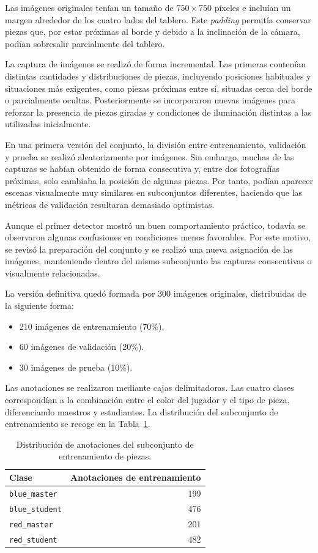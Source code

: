 Las imágenes originales tenían un tamaño de $750\times750$ píxeles e incluían un margen alrededor de los cuatro lados del tablero. Este \textit{padding} permitía conservar piezas que, por estar próximas al borde y debido a la inclinación de la cámara, podían sobresalir parcialmente del tablero.

La captura de imágenes se realizó de forma incremental. Las primeras contenían distintas cantidades y distribuciones de piezas, incluyendo posiciones habituales y situaciones más exigentes, como piezas próximas entre sí, situadas cerca del borde o parcialmente ocultas. Posteriormente se incorporaron nuevas imágenes para reforzar la presencia de piezas giradas y condiciones de iluminación distintas a las utilizadas inicialmente.

En una primera versión del conjunto, la división entre entrenamiento, validación y prueba se realizó aleatoriamente por imágenes. Sin embargo, muchas de las capturas se habían obtenido de forma consecutiva y, entre dos fotografías próximas, solo cambiaba la posición de algunas piezas. Por tanto, podían aparecer escenas visualmente muy similares en subconjuntos diferentes, haciendo que las métricas de validación resultaran demasiado optimistas.

Aunque el primer detector mostró un buen comportamiento práctico, todavía se observaron algunas confusiones en condiciones menos favorables. Por este motivo, se revisó la preparación del conjunto y se realizó una nueva asignación de las imágenes, manteniendo dentro del mismo subconjunto las capturas consecutivas o visualmente relacionadas.

La versión definitiva quedó formada por 300 imágenes originales, distribuidas de la siguiente forma:

\begin{itemize}
    \item 210 imágenes de entrenamiento (70\%).
    \item 60 imágenes de validación (20\%).
    \item 30 imágenes de prueba (10\%).
\end{itemize}

Las anotaciones se realizaron mediante cajas delimitadoras. Las cuatro clases correspondían a la combinación entre el color del jugador y el tipo de pieza, diferenciando maestros y estudiantes. La distribución del subconjunto de entrenamiento se recoge en la Tabla~\ref{tab:distribucion-piezas}.

\begin{table}[H]
\centering
\small
\begin{tabular}{l r}
\hline
\textbf{Clase} & \textbf{Anotaciones de entrenamiento} \\
\hline
\texttt{blue\_master} & 199 \\
\texttt{blue\_student} & 476 \\
\texttt{red\_master} & 201 \\
\texttt{red\_student} & 482 \\
\hline
\end{tabular}
\caption{Distribución de anotaciones del subconjunto de entrenamiento de piezas.}
\label{tab:distribucion-piezas}
\end{table}

